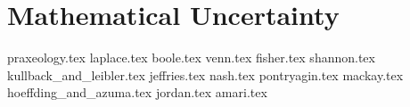 \part{Mathematical Uncertainty}

{praxeology.tex}
{laplace.tex}
{boole.tex}
{venn.tex}
{fisher.tex}
{shannon.tex}
{kullback_and_leibler.tex}
{jeffries.tex}
{nash.tex}
{pontryagin.tex}  
{mackay.tex}
{hoeffding_and_azuma.tex}
{jordan.tex}
{amari.tex}